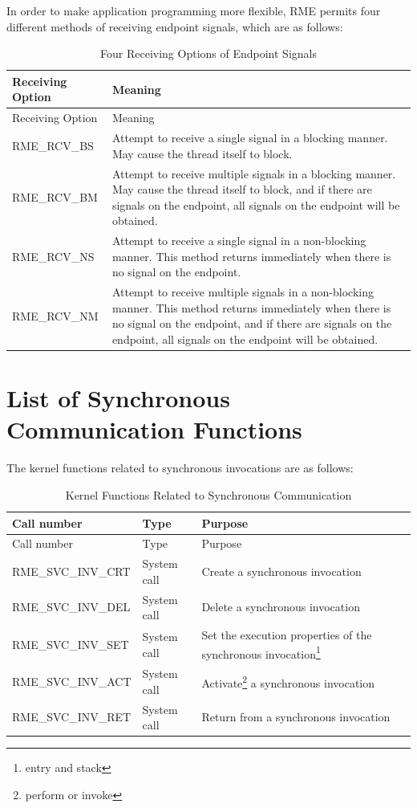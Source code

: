 In order to make application programming more flexible, RME permits four different methods of receiving endpoint signals, which are as follows:

\begin{xltabular}{\textwidth}{@{}>{\hsize\raggedright\arraybackslash}X>{\hsize\raggedright\arraybackslash}X@{}}
\caption{Four Receiving Options of Endpoint Signals}\label{tab:5-1-endpoint-signal-receive-methods}\\
\toprule
Receiving Option & Meaning\tabularnewline
\endfirsthead
\toprule
Receiving Option & Meaning\tabularnewline
\midrule
\endhead
\bottomrule
\endlastfoot
RME\_RCV\_BS &
Attempt to receive a single signal in a blocking manner. May cause the thread itself to block.\tabularnewline
RME\_RCV\_BM &
Attempt to receive multiple signals in a blocking manner. May cause the thread itself to block, and if there are signals on the endpoint, all signals on the endpoint will be obtained.\tabularnewline
RME\_RCV\_NS &
Attempt to receive a single signal in a non-blocking manner. This method returns immediately when there is no signal on the endpoint.\tabularnewline
RME\_RCV\_NM &
Attempt to receive multiple signals in a non-blocking manner. This method returns immediately when there is no signal on the endpoint, and if there are signals on the endpoint, all signals on the endpoint will be obtained.\tabularnewline
\end{xltabular}
\nopagebreak[4]

\section{List of Synchronous Communication Functions}\label{sec:5-sync-communication-function-list}

The kernel functions related to synchronous invocations are as follows:

\begin{xltabular}{\textwidth}{@{}>{\hsize\raggedright\arraybackslash}X>{\hsize\raggedright\arraybackslash}X>{\hsize\raggedright\arraybackslash}X@{}}
\caption{Kernel Functions Related to Synchronous Communication}\label{tab:5-2-sync-communication-kernel-functions}\\
\toprule
Call number & Type & Purpose\tabularnewline
\endfirsthead
\toprule
Call number & Type & Purpose\tabularnewline
\midrule
\endhead
\bottomrule
\endlastfoot
RME\_SVC\_INV\_CRT & System call & Create a synchronous invocation\tabularnewline
RME\_SVC\_INV\_DEL & System call & Delete a synchronous invocation\tabularnewline
RME\_SVC\_INV\_SET & System call &
Set the execution properties of the synchronous invocation\footnote{entry and stack}\tabularnewline
RME\_SVC\_INV\_ACT & System call &
Activate\footnote{perform or invoke} a synchronous invocation\tabularnewline
RME\_SVC\_INV\_RET & System call & Return from a synchronous invocation\tabularnewline
\end{xltabular}
\nopagebreak[4]

